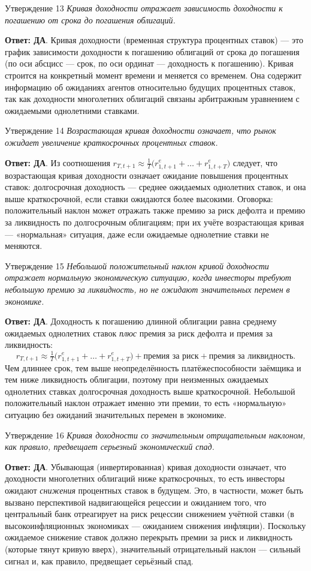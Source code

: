 \documentclass[10pt,a4paper]{article}
\newcommand{\qda}{\textbf{\color{yesgreen}Ответ: ДА}}
\newenvironment{answer}[2]{%
  \begin{qbox}{Утверждение #1}
  \textit{#2}\par\smallskip
}{%
  \end{qbox}\vspace{2pt}
}
\begin{document}
\begin{answer}{13}{Кривая доходности отражает зависимость доходности к погашению от срока до погашения облигаций.}
\qda. Кривая доходности (временная структура процентных ставок) --- это график зависимости доходности к погашению облигаций от срока до погашения (по оси абсцисс --- срок, по оси ординат --- доходность к погашению). Кривая строится на конкретный момент времени и меняется со временем. Она содержит информацию об ожиданиях агентов относительно будущих процентных ставок, так как доходности многолетних облигаций связаны арбитражным уравнением с ожидаемыми однолетними ставками.
\end{answer}

\begin{answer}{14}{Возрастающая кривая доходности означает, что рынок ожидает увеличение краткосрочных процентных ставок.}
\qda. Из соотношения $r_{T,t+1}\approx\frac1T\bigl(r^e_{1,t+1}+\dots+r^e_{1,t+T}\bigr)$ следует, что возрастающая кривая доходности означает ожидание повышения процентных ставок: долгосрочная доходность --- среднее ожидаемых однолетних ставок, и она выше краткосрочной, если ставки ожидаются более высокими. Оговорка: положительный наклон может отражать также премию за риск дефолта и премию за ликвидность по долгосрочным облигациям; при их учёте возрастающая кривая --- «нормальная» ситуация, даже если ожидаемые однолетние ставки не меняются.
\end{answer}

\begin{answer}{15}{Небольшой положительный наклон кривой доходности отражает нормальную экономическую ситуацию, когда инвесторы требуют небольшую премию за ликвидность, но не ожидают значительных перемен в экономике.}
\qda. Доходность к погашению длинной облигации равна среднему ожидаемых однолетних ставок \emph{плюс} премия за риск дефолта и премия за ликвидность:
\[
r_{T,t+1}\approx\tfrac1T\bigl(r^e_{1,t+1}+\dots+r^e_{1,t+T}\bigr)+\text{премия за риск}+\text{премия за ликвидность}.
\]
Чем длиннее срок, тем выше неопределённость платёжеспособности заёмщика и тем ниже ликвидность облигации, поэтому при неизменных ожидаемых однолетних ставках долгосрочная доходность выше краткосрочной. Небольшой положительный наклон отражает именно эти премии, то есть «нормальную» ситуацию без ожиданий значительных перемен в экономике.
\end{answer}

\begin{answer}{16}{Кривая доходности со значительным отрицательным наклоном, как правило, предвещает серьезный экономический спад.}
\qda. Убывающая (инвертированная) кривая доходности означает, что доходности многолетних облигаций ниже краткосрочных, то есть инвесторы ожидают \emph{снижения} процентных ставок в будущем. Это, в частности, может быть вызвано перспективой надвигающейся рецессии и ожиданием того, что центральный банк отреагирует на риск рецессии снижением учётной ставки (в высокоинфляционных экономиках --- ожиданием снижения инфляции). Поскольку ожидаемое снижение ставок должно перекрыть премии за риск и ликвидность (которые тянут кривую вверх), значительный отрицательный наклон --- сильный сигнал и, как правило, предвещает серьёзный спад.
\end{answer}
\end{document}
